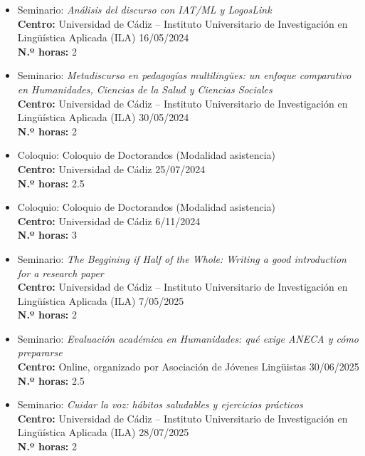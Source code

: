 \begin{enumerate}[label=\alph*)]
\begin{itemize}
\begin{itemize}[label=\textbullet]
  \item Seminario: \textit{Análisis del discurso con IAT/ML y LogosLink}\\
  \textbf{Centro:} Universidad de Cádiz – Instituto Universitario de Investigación en Lingüística Aplicada (ILA)
  \hfill 16/05/2024\\
  \textbf{N.º horas:} 2

  \item Seminario: \textit{Metadiscurso en pedagogías multilingües: un enfoque comparativo en Humanidades, Ciencias de la Salud y Ciencias Sociales}\\
  \textbf{Centro:} Universidad de Cádiz – Instituto Universitario de Investigación en Lingüística Aplicada (ILA)
  \hfill 30/05/2024\\
  \textbf{N.º horas:} 2

  \item Coloquio: Coloquio de Doctorandos (Modalidad asistencia) \\
  \textbf{Centro:} Universidad de Cádiz
  \hfill 25/07/2024\\
  \textbf{N.º horas:} 2.5

  \item Coloquio: Coloquio de Doctorandos (Modalidad asistencia) \\
  \textbf{Centro:} Universidad de Cádiz
  \hfill 6/11/2024\\
  \textbf{N.º horas:} 3

  \item Seminario: \textit{The Beggining if Half of the Whole: Writing a good introduction for a research paper}\\
  \textbf{Centro:} Universidad de Cádiz – Instituto Universitario de Investigación en Lingüística Aplicada (ILA)
  \hfill 7/05/2025\\
  \textbf{N.º horas:} 2

  \item Seminario: \textit{Evaluación académica en Humanidades: qué exige ANECA y cómo prepararse}\\
  \textbf{Centro:} Online, organizado por Asociación de Jóvenes Lingüistas
  \hfill 30/06/2025\\
  \textbf{N.º horas:} 2.5

  \item Seminario: \textit{Cuidar la voz: hábitos saludables y ejercicios prácticos}\\
  \textbf{Centro:} Universidad de Cádiz – Instituto Universitario de Investigación en Lingüística Aplicada (ILA)
  \hfill 28/07/2025\\
  \textbf{N.º horas:} 2


\end{itemize}
\end{itemize}
\end{enumerate}
